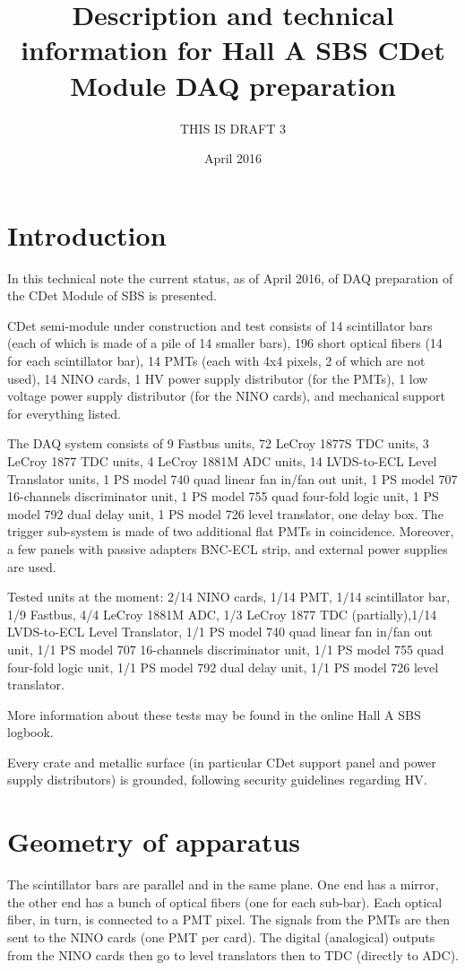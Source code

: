 \documentclass{article}
\title{Description and technical information for Hall A SBS CDet Module DAQ preparation}
\author{THIS IS DRAFT 3}
\date{April 2016}
\begin{document}
\maketitle

\tableofcontents

\section{Introduction}\label{sec:intro}
In this technical note the current status, as of April 2016, of DAQ preparation of the CDet Module of SBS is presented.

CDet semi-module under construction and test consists of 14 scintillator bars (each of which is made of a pile of 14 smaller bars), 196 short optical fibers (14 for each scintillator bar), 14 PMTs (each with 4x4 pixels, 2 of which are not used), 14 NINO cards, 1 HV power supply distributor (for the PMTs), 1 low voltage power supply distributor (for the NINO cards), and mechanical support for everything listed.

The DAQ system consists of 9 Fastbus units, 72 LeCroy 1877S TDC units, 3 LeCroy 1877 TDC units, 4 LeCroy 1881M ADC units, 14 LVDS-to-ECL Level Translator units, 1 PS model 740 quad linear fan in/fan out unit, 1 PS model 707 16-channels discriminator unit, 1 PS model 755 quad four-fold logic unit, 1 PS model 792 dual delay unit, 1 PS model 726 level translator, one delay box. The trigger sub-system is made of two additional flat PMTs in coincidence. Moreover, a few panels with passive adapters BNC-ECL strip, and external power supplies are used.

Tested units at the moment: 2/14 NINO cards, 1/14 PMT, 1/14 scintillator bar, 1/9 Fastbus, 4/4 LeCroy 1881M ADC, 1/3 LeCroy 1877 TDC (partially),1/14 LVDS-to-ECL Level Translator, 1/1 PS model 740 quad linear fan in/fan out unit, 1/1 PS model 707 16-channels discriminator unit, 1/1 PS model 755 quad four-fold logic unit, 1/1 PS model 792 dual delay unit, 1/1 PS model 726 level translator.

More information about these tests may be found in the online Hall A SBS logbook.

Every crate and metallic surface (in particular CDet support panel and power supply distributors) is grounded, following security guidelines regarding HV.

\section{Geometry of apparatus}\label{sec:geom}
The scintillator bars are parallel and in the same plane. One end has a mirror, the other end has a bunch of optical fibers (one for each sub-bar).
Each optical fiber, in turn, is connected to a PMT pixel.
The signals from the PMTs are then sent to the NINO cards (one PMT per card).
The digital (analogical) outputs from the NINO cards then go to level translators then to TDC (directly to ADC).
\end{document}
